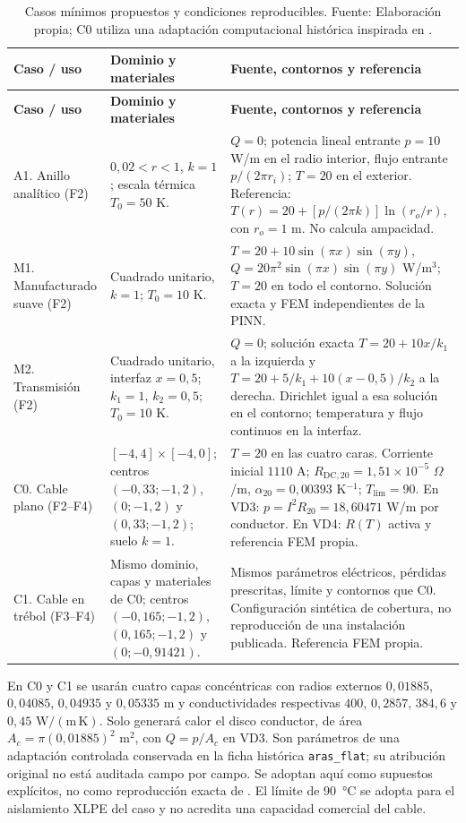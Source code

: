 \begingroup\footnotesize
\begin{longtable}{L{2.1cm}L{4.9cm}L{6.5cm}}
\caption{Casos mínimos propuestos y condiciones reproducibles. Fuente: Elaboración propia; C0 utiliza una adaptación computacional histórica inspirada en \textcite{aras2005}.}
\label{tab:catalogo-minimo}\\
\toprule
\textbf{Caso / uso} & \textbf{Dominio y materiales} & \textbf{Fuente, contornos y referencia} \\
\midrule\endfirsthead
\toprule
\textbf{Caso / uso} & \textbf{Dominio y materiales} & \textbf{Fuente, contornos y referencia} \\
\midrule\endhead
\bottomrule\endfoot
A1. Anillo analítico (F2) & $0{,}02<r<1$, $k=1$; escala térmica $T_0=50$ K. & $Q=0$; potencia lineal entrante $p=10$ W/m en el radio interior, flujo entrante $p/(2\pi r_i)$; $T=20$ en el exterior. Referencia: $T(r)=20+[p/(2\pi k)]\ln(r_o/r)$, con $r_o=1$ m. No calcula ampacidad. \\
M1. Manufacturado suave (F2) & Cuadrado unitario, $k=1$; $T_0=10$ K. & $T=20+10\sin(\pi x)\sin(\pi y)$, $Q=20\pi^2\sin(\pi x)\sin(\pi y)$ W/m$^3$; $T=20$ en todo el contorno. Solución exacta y FEM independientes de la PINN. \\
M2. Transmisión (F2) & Cuadrado unitario, interfaz $x=0{,}5$; $k_1=1$, $k_2=0{,}5$; $T_0=10$ K. & $Q=0$; solución exacta $T=20+10x/k_1$ a la izquierda y $T=20+5/k_1+10(x-0{,}5)/k_2$ a la derecha. Dirichlet igual a esa solución en el contorno; temperatura y flujo continuos en la interfaz. \\
C0. Cable plano (F2--F4) & $[-4,4]\times[-4,0]$; centros $(-0{,}33;-1{,}2)$, $(0;-1{,}2)$ y $(0{,}33;-1{,}2)$; suelo $k=1$. & $T=20$ en las cuatro caras. Corriente inicial $1110$ A; $R_{\mathrm{DC},20}=1{,}51\times10^{-5}$ $\Omega$/m, $\alpha_{20}=0{,}00393$ K$^{-1}$; $T_{\mathrm{lim}}=90$. En VD3: $p=I^2R_{20}=18{,}60471$ W/m por conductor. En VD4: $R(T)$ activa y referencia FEM propia. \\
C1. Cable en trébol (F3--F4) & Mismo dominio, capas y materiales de C0; centros $(-0{,}165;-1{,}2)$, $(0{,}165;-1{,}2)$ y $(0;-0{,}91421)$. & Mismos parámetros eléctricos, pérdidas prescritas, límite y contornos que C0. Configuración sintética de cobertura, no reproducción de una instalación publicada. Referencia FEM propia. \\
\end{longtable}
\endgroup

En C0 y C1 se usarán cuatro capas concéntricas con radios externos $0{,}01885$, $0{,}04085$, $0{,}04935$ y $0{,}05335$ m y conductividades respectivas $400$, $0{,}2857$, $384{,}6$ y $0{,}45$ $\mathrm{W/(m\,K)}$. Solo generará calor el disco conductor, de área $A_c=\pi(0{,}01885)^2$ m$^2$, con $Q=p/A_c$ en VD3. Son parámetros de una adaptación controlada conservada en la ficha histórica \texttt{aras\_flat}; su atribución original no está auditada campo por campo. Se adoptan aquí como supuestos explícitos, no como reproducción exacta de \textcite{aras2005}. El límite de \SI{90}{\celsius} se adopta para el aislamiento XLPE del caso y no acredita una capacidad comercial del cable.

